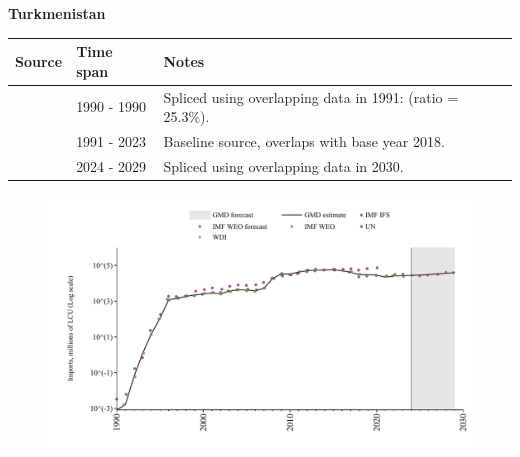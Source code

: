 \documentclass[12pt,a4paper,landscape]{article}
\begin{document}
\begin{adjustbox}{max totalsize={\paperwidth}{\paperheight},center}
\begin{minipage}[t][\textheight][t]{\textwidth}
\vspace*{0.5cm}
{}
\begin{center}
{\Large\bfseries Turkmenistan}
\end{center}
\vspace{0.5cm}
\begin{table}[H]
\centering
\small
\begin{tabular}{|l|l|l|}
\hline
\textbf{Source} & \textbf{Time span} & \textbf{Notes} \\
\hline
\rowcolor{white}\cite{UN}& 1990 - 1990 &Spliced using overlapping data in 1991: (ratio = 25.3\%).\\
\rowcolor{lightgray}\cite{WDI}& 1991 - 2023 &Baseline source, overlaps with base year 2018.\\
\rowcolor{white}\cite{IMF_WEO_forecast}& 2024 - 2029 &Spliced using overlapping data in 2030.\\
\hline
\end{tabular}
\end{table}
\begin{figure}[H]
\centering
\includegraphics[width=\textwidth,height=0.6\textheight,keepaspectratio]{graphs/TKM_imports.pdf}
\end{figure}
\end{minipage}
\end{adjustbox}
\end{document}
